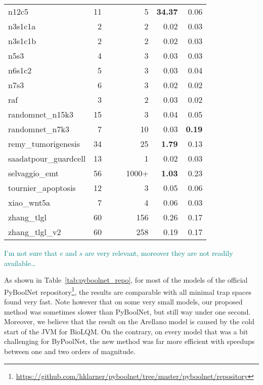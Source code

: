 \documentclass[runningheads]{llncs}
\newcommand{\sylvain}[1]{\textcolor{teal}{#1}}
\begin{document}
\begin{table}[!htb]
\begin{tabular}{lrrrrrr}
    n12c5 & 11 &&& 5 & \textbf{34.37} & 0.06\\
    n3s1c1a & 2 &&& 2 & 0.02 & 0.03\\
    n3s1c1b & 2 &&& 2 & 0.02 & 0.03\\
    n5s3 & 4 &&& 3 & 0.03 & 0.03\\
    n6s1c2 & 5 &&& 3 & 0.03 & 0.04\\
    n7s3 & 6 &&& 3 & 0.02 & 0.02\\
    raf & 3 &&& 2 & 0.03 & 0.02\\
    randomnet\_n15k3 & 15 &&& 3 & 0.04 & 0.05\\
    randomnet\_n7k3 & 7 &&& 10 & 0.03 & \textbf{0.19}\\
    remy\_tumorigenesis & 34 &&& 25 & \textbf{1.79} & 0.13\\
    saadatpour\_guardcell & 13 &&& 1 & 0.02 & 0.03\\
    selvaggio\_emt & 56 &&& 1000+ & \textbf{1.03} & 0.23\\
    tournier\_apoptosis & 12 &&& 3 & 0.05 & 0.06\\
    xiao\_wnt5a & 7 &&& 4 & 0.06 & 0.03\\
    zhang\_tlgl & 60 &&& 156 & 0.26 & 0.17\\
    zhang\_tlgl\_v2 & 60 &&& 258 & 0.19 & 0.17\\
    \bottomrule
  \end{tabular}

  \sylvain{I'm not sure that \(e\) and \(s\) are very relevant, moreover they are not readily available\dots}
\end{table}

As shown in Table~\ref{tab:pyboolnet_repo}, for most of the models of the official PyBoolNet repository\footnote{\url{https://github.com/hklarner/pyboolnet/tree/master/pyboolnet/repository}}, the results are comparable with all minimal trap spaces found very fast.
Note however that on some very small models, our proposed method was sometimes slower than PyBoolNet, but still way under one second.
Moreover, we believe that the result on the Arellano model is caused by the cold start of the JVM for BioLQM.
On the contrary, on every model that was a bit challenging for ByPoolNet, the new method was far more efficient with speedups between one and two orders of magnitude.
\end{document}
